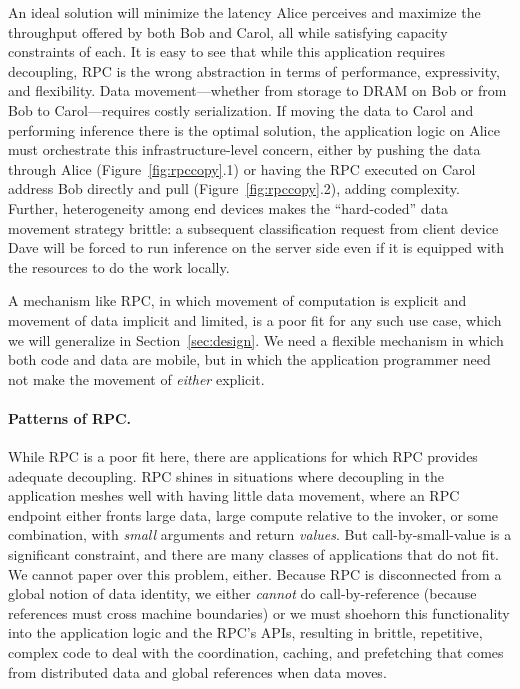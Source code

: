 {    An ideal solution will minimize the latency Alice perceives and maximize the throughput offered
    by both Bob and Carol, all while satisfying capacity constraints of each. It is easy to see
    that while this application requires decoupling, RPC is the wrong abstraction in terms of performance,
    expressivity, and flexibility.  Data movement---whether from storage to DRAM on Bob or from Bob
    to Carol---requires costly serialization. If moving the data to Carol and performing
    inference there is the optimal solution, the application logic on Alice must orchestrate this
    infrastructure-level concern, either by pushing the data through Alice (Figure~\ref{fig:rpccopy}.1)
    or having the RPC executed
    on Carol address Bob directly and pull (Figure~\ref{fig:rpccopy}.2), adding complexity. Further,
    heterogeneity among end devices makes the ``hard-coded'' data movement strategy
    brittle:
    a subsequent classification request from client device Dave will be forced to run inference
    on the server side even if it is equipped with the resources to do the work locally.

    A mechanism like RPC, in which movement of computation is explicit and movement of data implicit and
    limited, is a poor fit for any such use case, which we will generalize in Section~\ref{sec:design}.
    We need a flexible mechanism in which both code and data are mobile, but in which the
    application programmer need not make the movement of \emph{either} explicit.



    \paragraph*{Patterns of RPC.}
    While RPC is a poor fit here, there are applications for which RPC provides adequate decoupling.
    RPC shines in situations where decoupling in the application meshes well with having little data
    movement, where an RPC endpoint either fronts large data, large compute relative to the invoker, or
    some combination, with \emph{small} arguments and return \emph{values}.
    But call-by-small-value is a significant constraint, and there are many
    classes of applications that do not fit.
    We cannot paper over this problem, either.
    Because
    RPC is disconnected from a global notion of data identity, we either \emph{cannot} do
    call-by-reference (because references must cross machine boundaries) or we must shoehorn this
    functionality into the application logic and the RPC's APIs, resulting in brittle, repetitive,
    complex code to deal with the coordination, caching, and prefetching that
    comes from distributed data and global references when data moves.








}